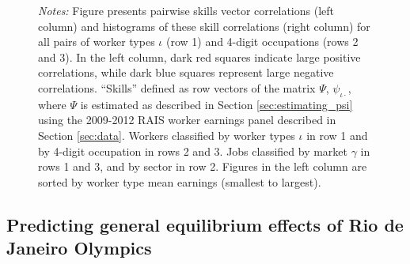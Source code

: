 \documentclass[12pt]{article}
\def\g{\gamma}
\def\i{\iota}
\theoremstyle{definition}
\theoremstyle{plain}
\begin{document}
\begin{figure}[!htbp]
\begin{subfigure}[b]{\w\textwidth}
		\label{fig:correlograms_hist_occ4_first_recode_gamma_sorted}
	\end{subfigure}
	\label{fig:correlograms_sorted}
	\flushleft\footnotesize \emph{Notes:} Figure presents pairwise skills vector correlations (left column) and histograms of these skill correlations (right column) for all pairs of worker types $\i$ (row 1) and 4-digit occupations (rows 2 and 3). In the left column, dark red squares indicate large positive correlations, while dark blue squares represent large negative correlations. ``Skills'' defined as row vectors of the matrix $\Psi$, $\psi_{\i\cdot}$, where $\Psi$ is estimated as described in Section \ref{sec:estimating_psi} using the 2009-2012 RAIS worker earnings panel described in Section \ref{sec:data}. Workers classified by worker types $\i$ in row 1 and by 4-digit occupation in rows 2 and 3. Jobs classified by market $\g$ in rows 1 and 3, and by sector in row 2. Figures in the left column are sorted by worker type mean earnings (smallest to largest).
\end{figure}



\subsection{Predicting general equilibrium effects of Rio de Janeiro Olympics}

\label{sec:model_fit}

%
\end{document}
